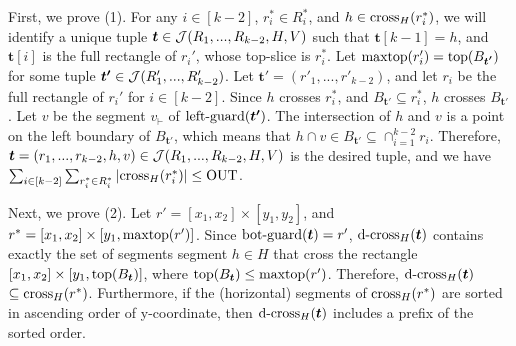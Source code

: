 First, we prove (1). For any $i \in [k-2]$, $r_i^*\in R_i^*$, and $h \in \mathrm{cross}_H(r_i^*)$, we will identify a unique tuple $\textrm{\boldmath${t}$} \in \mathcal{J}(R_1,...,R_{k-2},H,V)$ such that $\bm{t}[k-1] = h$, and $\bm{t}[i]$ is the full rectangle of $r_i'$, whose top-slice is $r_i^*$. Let $\mathrm{maxtop}(r_i') = \mathrm{top}(B_{\textrm{\boldmath${t'}$}})$ for some tuple $\textrm{\boldmath${t'}$} \in \mathcal{J}(R_1',...,R_{k-2}')$. Let $\bm{t'} = (r'_1,...,r'_{k-2})$, and let $r_i$ be the full rectangle of $r_i'$ for $i \in [k-2]$. Since $h$ crosses $r_i^*$, and $B_\bm{t'} \subseteq r_i^*$, $h$ crosses $B_{\bm{t'}}$. Let $v$ be the segment $v_\vdash$ of $\mathrm{left\text{-}guard}(\textrm{\boldmath${t'}$})$. The intersection of $h$ and $v$ is a point on the left boundary of $B_{\bm{t'}}$, which means that $h\cap v \in B_{\bm{t'}} \subseteq \cap_{i = 1}^{k-2}r_i$. Therefore, $\textrm{\boldmath${t}$} = (r_1,...,r_{k-2},h,v)\in \mathcal{J}(R_1,...,R_{k-2},H,V)$ is the desired tuple, and we have $\sum_{i \in [k-2]}\sum_{r_i^*\in R_i^*} |\mathrm{cross}_H(r_i^*)| \leq \mathrm{OUT}$.

Next, we prove (2). Let $r' = [x_1,x_2]\times [y_1,y_2]$, and $r^* = [x_1,x_2] \times [y_1,\mathrm{maxtop}(r')]$. Since $\mathrm{bot\text{-}guard}(\textrm{\boldmath${t}$}) = r'$, $\mathrm{d\text{-}cross}_H(\textrm{\boldmath${t}$})$ contains exactly the set of segments segment $h \in H$ that cross the rectangle $[x_1,x_2]\times [y_1, \mathrm{top}(B_{\textrm{\boldmath${t}$}})]$, where $\mathrm{top}(B_{\textrm{\boldmath${t}$}})\leq \mathrm{maxtop}(r')$. Therefore, $\mathrm{d\text{-}cross}_H(\textrm{\boldmath${t}$})$ $\subseteq \mathrm{cross}_H(r^*)$. Furthermore, if the (horizontal) segments of $\mathrm{cross}_H(r^*)$ are sorted in ascending order of y-coordinate, then $\mathrm{d\text{-}cross}_H(\textrm{\boldmath${t}$})$ includes a prefix of the sorted order.